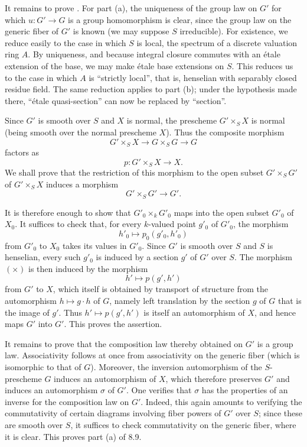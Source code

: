 It remains to prove . For part (a), the uniqueness of the group law on
\(G'\) for which \(u:G'\to G\) is a group homomorphism is clear, since
the group law on the generic fiber of \(G'\) is known (we may suppose
\(S\) irreducible). For existence, we reduce easily to the case in which
\(S\) is local, the spectrum of a discrete valuation ring \(A\). By
uniqueness, and because integral closure commutes with an étale extension
of the base, we may make étale base extensions on \(S\). This reduces us
to the case in which \(A\) is ``strictly local'', that is, henselian with
separably closed residue field. The same reduction applies to part (b);
under the hypothesis made there, ``étale quasi-section'' can now be
replaced by ``section''.

Since \(G'\) is smooth over \(S\) and \(X\) is normal, the prescheme
\(G'\times_S X\) is normal (being smooth over the normal prescheme \(X\)).
Thus the composite morphism
\[
  G'\times_S X\longrightarrow G\times_S G\longrightarrow G
\]
factors as
\[
  p:G'\times_S X\longrightarrow X.
\]
We shall prove that the restriction of this morphism to the open subset
\(G'\times_S G'\) of \(G'\times_S X\) induces a morphism
\[
  G'\times_S G'\longrightarrow G'.
\]

It is therefore enough to show that \(G'_0\times_k G'_0\) maps into the
open subset \(G'_0\) of \(X_0\). It suffices to check that, for every
\(k\)-valued point \(g'_0\) of \(G'_0\), the morphism
\[
  \tag{\(\times\)}\label{sga3:x:lemma:8-9:equation:times}
  h'_0\longmapsto p_0(g'_0,h'_0)
\]
from \(G'_0\) to \(X_0\) takes its values in \(G'_0\). Since \(G'\) is
smooth over \(S\) and \(S\) is henselian, every such \(g'_0\) is induced
by a section \(g'\) of \(G'\) over \(S\). The morphism \((\times)\) is
then induced by the morphism
\[
  h'\longmapsto p(g',h')
\]
from \(G'\) to \(X\), which itself is obtained by transport of structure
from the automorphism \(h\mapsto g\cdot h\) of \(G\), namely left
translation by the section \(g\) of \(G\) that is the image of \(g'\).
Thus \(h'\mapsto p(g',h')\) is itself an automorphism of \(X\), and hence
maps \(G'\) into \(G'\). This proves the assertion.

It remains to prove that the composition law thereby obtained on \(G'\)
is a group law. Associativity follows at once from associativity on the
generic fiber (which is isomorphic to that of \(G\)). Moreover, the
inversion automorphism of the \(S\)-prescheme \(G\) induces an automorphism
of \(X\), which therefore preserves \(G'\) and induces an automorphism
\(\sigma\) of \(G'\). One verifies that \(\sigma\) has the properties of
an inverse for the composition law on \(G'\). Indeed, this again amounts
to verifying the commutativity of certain diagrams involving fiber
powers of \(G'\) over \(S\); since these are smooth over \(S\), it
suffices to check commutativity on the generic fiber, where it is clear.
This proves part (a) of 8.9.

